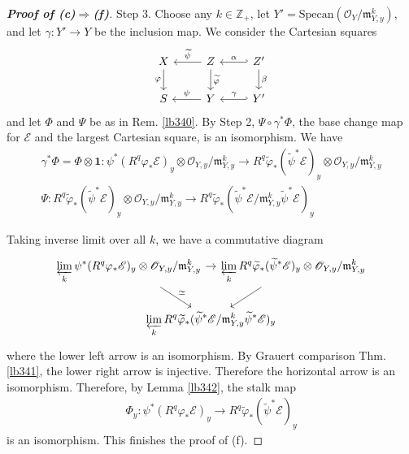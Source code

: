 \documentclass[12pt,b5paper,notitlepage]{report}
\theoremstyle{definition}
\theoremstyle{plain}
\newcommand{\wtd}{\widetilde}
\newcommand{\id}{\mathbf{1}}
\newcommand{\scr}{\mathscr}
\newcommand{\Zbb}{\mathbb Z}
\newcommand{\Specan}{\mathrm{Specan}}
\newcommand{\mk}{\mathfrak m}
\numberwithin{equation}{section}
\begin{document}
\begin{proof}[\textbf{Proof of (c)$\Rightarrow$(f)}]
Step 3. Choose any $k\in\Zbb_+$, let $Y'=\Specan(\scr O_Y/\mk_{Y,y}^k)$, and let $\gamma:Y'\rightarrow Y$ be the inclusion map. We consider the Cartesian squares
\begin{equation*}
\begin{tikzcd}
X \arrow[d, "\varphi"'] & Z \arrow[l, "\wtd\psi"'] \arrow[d, "\wtd\varphi"] &Z' \arrow[l,"\alpha"',hook'] \arrow[d,"\beta"]\\
S                       & Y \arrow[l, "\psi"']                             &Y' \arrow[l,"\gamma"',hook']
\end{tikzcd}
\end{equation*}
and let $\Phi$ and $\Psi$ be as in Rem. \ref{lb340}. By Step 2, $\Psi\circ\gamma^*\Phi$, the base change map for $\scr E$ and the largest Cartesian square, is an isomorphism. We have
\begin{gather*}
\gamma^*\Phi=\Phi\otimes\id: \psi^*(R^q\varphi_*\scr E)_y\otimes \scr O_{Y,y}/{\mk_{Y,y}^k}\rightarrow R^q\wtd\varphi_*(\wtd\psi^*\scr E)_y\otimes \scr O_{Y,y}/{\mk_{Y,y}^k}\\
\Psi:R^q\wtd\varphi_*(\wtd\psi^*\scr E)_y\otimes \scr O_{Y,y}/{\mk_{Y,y}^k}\rightarrow R^q\wtd\varphi_*(\wtd\psi^*\scr E/\mk_{Y,y}^k\wtd\psi^*\scr E)_y
\end{gather*}

Taking inverse limit over all $k$, we have a commutative diagram
\begin{equation*}
\begin{tikzcd}[column sep=-2cm]
\displaystyle\varprojlim_k \psi^*(R^q\varphi_*\scr E)_y\otimes \scr O_{Y,y}/{\mk_{Y,y}^k} \arrow[rr] \arrow[rd,"\simeq"] &              &  \displaystyle\varprojlim_k R^q\wtd\varphi_*(\wtd\psi^*\scr E)_y\otimes \scr O_{Y,y}/{\mk_{Y,y}^k} \\
                        & \displaystyle\varprojlim_k R^q\wtd\varphi_*(\wtd\psi^*\scr E/\mk_{Y,y}^k\wtd\psi^*\scr E)_y \arrow[from=ru] &  
\end{tikzcd}
\end{equation*}
where the lower left arrow is an isomorphism.  By Grauert comparison Thm. \ref{lb341},  the lower right arrow is injective. Therefore the horizontal arrow is an isomorphism. Therefore, by Lemma \ref{lb342}, the stalk map
\begin{align*}
\Phi_y:\psi^*(R^q\varphi_*\scr E)_y\rightarrow  R^q\wtd\varphi_*(\wtd\psi^*\scr E)_y
\end{align*}
is an isomorphism. This finishes the proof of (f).
\end{proof}
\end{document}
